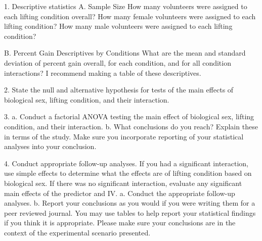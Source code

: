\documentclass[onecolumn,10pt]{jhwhw}
\begin{document}
1. Descriptive statistics
A. Sample Size
How many volunteers were assigned to each lifting condition overall?
How many female volunteers were assigned to each lifting condition?
How many male volunteers were assigned to each lifting condition?

B. Percent Gain Descriptives by Conditions
What are the mean and standard deviation of percent gain overall, for each condition, and for all condition interactions? I recommend making a table of these descriptives.

2. State the null and alternative hypothesis for tests of the main effects of biological sex, lifting condition, and their interaction.

3.
a. Conduct a factorial ANOVA testing the main effect of biological sex, lifting condition, and their interaction.
b. What conclusions do you reach? Explain these in terms of the study. Make sure you incorporate reporting of your statistical analyses into your conclusion.

4. Conduct appropriate follow-up analyses. If you had a significant interaction, use simple effects to determine what the effects are of lifting condition based on biological sex. If there was no significant interaction, evaluate any significant main effects of the predictor and IV.
a. Conduct the appropriate follow-up analyses.
b. Report your conclusions as you would if you were writing them for a peer reviewed journal. You may use tables to help report your statistical findings if you think it is appropriate. Please make sure your conclusions are in the context of the experimental scenario presented.
\end{document}

